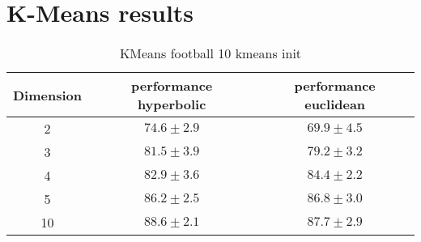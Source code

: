 \documentclass{article}
\begin{document}



\section{K-Means results}
\begin{table}
    \centering
    \begin{tabular}{|c|cc|}
    \hline Dimension & performance hyperbolic & performance euclidean\\ \hline
    2& $74.6 \pm 2.9$ & $69.9 \pm 4.5$\\ \hline
    3& $81.5 \pm 3.9$ & $79.2 \pm 3.2$\\ \hline
    4& $82.9 \pm 3.6$ & $84.4 \pm 2.2$\\ \hline
    5& $86.2 \pm 2.5$ & $86.8 \pm 3.0$\\ \hline
    10& $88.6 \pm 2.1$ & $87.7 \pm 2.9$\\ \hline

    \end{tabular} 
    \caption{KMeans football 10 kmeans init}
\end{table}
\end{document}
